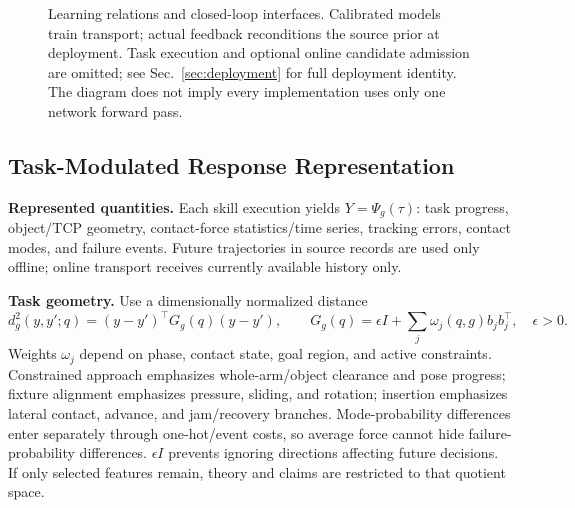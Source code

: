 \documentclass[11pt]{article}
\begin{document}
\begin{figure}[ht]
\centering
{}
\caption{Learning relations and closed-loop interfaces. Calibrated models train transport;
actual feedback reconditions the source prior at deployment. Task execution and optional
online candidate admission are omitted; see Sec.~\ref{sec:deployment} for full deployment
identity. The diagram does not imply every implementation uses only one network forward pass.}
\end{figure}

\subsection{Task-Modulated Response Representation}
\label{sec:geometry}
\textbf{Represented quantities.} Each skill execution yields $Y=\Psi_g(\tau)$: task progress, object/TCP geometry, contact-force statistics/time series, tracking errors, contact modes, and failure events. Future trajectories in source records are used only offline; online transport receives currently available history only.

\textbf{Task geometry.} Use a dimensionally normalized distance
\begin{equation}
 d_g^2(y,y';q)=(y-y')^\top G_g(q)(y-y'),\qquad
 G_g(q)=\epsilon I+\sum_j\omega_j(q,g)b_jb_j^\top,\quad\epsilon>0.
 \label{eq:metric}
\end{equation}
Weights $\omega_j$ depend on phase, contact state, goal region, and active constraints.
Constrained approach emphasizes whole-arm/object clearance and pose progress; fixture
alignment emphasizes pressure, sliding, and rotation; insertion emphasizes lateral
contact, advance, and jam/recovery branches. Mode-probability differences enter separately
through one-hot/event costs, so average force cannot hide failure-probability differences.
$\epsilon I$ prevents ignoring directions affecting future decisions. If only selected
features remain, theory and claims are restricted to that quotient space.
\end{document}
